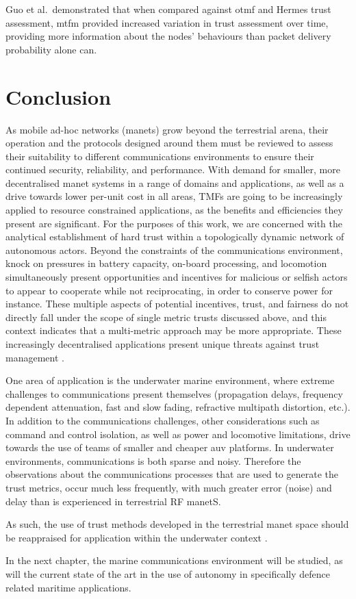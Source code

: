 Guo et al.\ demonstrated that when compared against \acrshort{otmf} and Hermes trust assessment, \acrshort{mtfm} provided increased variation in trust assessment over time, providing more information about the nodes' behaviours than packet delivery probability alone can.
\section{Conclusion}
As mobile ad-hoc networks (\gls{manet}s) grow beyond the terrestrial arena, their operation and the protocols designed around them must be reviewed to assess their suitability to different communications environments to ensure their continued security, reliability, and performance.
With demand for smaller, more decentralised \gls{manet} systems in a range of domains and applications, as well as a drive towards lower per-unit cost in all areas, TMFs are going to be increasingly applied to resource constrained applications, as the benefits and efficiencies they present are significant.
For the purposes of this work, we are concerned with the analytical establishment of hard trust within a topologically dynamic network of autonomous actors.
Beyond the constraints of the communications environment, knock on pressures in battery capacity, on-board processing, and locomotion simultaneously present opportunities and incentives for malicious or selfish actors to appear to cooperate while not reciprocating, in order to conserve power for instance.
These multiple aspects of potential incentives, trust, and fairness do not directly fall under the scope of single metric trusts discussed above, and this context indicates that a multi-metric approach may be more appropriate.
These increasingly decentralised applications present unique threats against trust management \cite{Caiti2011}.

One area of application is the underwater marine environment, where extreme challenges to communications present themselves (propagation delays, frequency dependent attenuation, fast and slow fading, refractive multipath distortion, etc.).
In addition to the communications challenges, other considerations such as command and control isolation, as well as power and locomotive limitations, drive towards the use of teams of smaller and cheaper \acrfull{auv} platforms.
In underwater environments, communications is both sparse and noisy.
Therefore the observations about the communications processes that are used to generate the trust metrics, occur much less frequently, with much greater error (noise) and delay than is experienced in terrestrial RF \gls{manet}S.

As such, the use of trust methods developed in the terrestrial \gls{manet} space should be reappraised for application within the underwater context \cite{Pavan2015}.

In the next chapter, the marine communications environment will be studied, as will the current state of the art in the use of autonomy in specifically defence related maritime applications.
\ifx\ifthesis\undefined

\else
\fi
